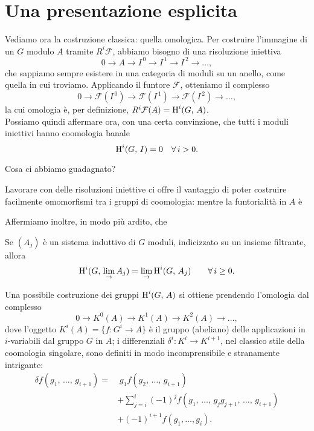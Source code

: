 \section{Una presentazione esplicita}
Vediamo ora la costruzione classica: quella omologica. Per costruire l'immagine di un $ G $ modulo $ A $ tramite $ R^i\mathcal{F} $, abbiamo bisogno di una risoluzione iniettiva
\[ 0 \to A \to I^{\,0} \to I^{\,1} \to I^{\,2} \to \dots, \]
che sappiamo sempre esistere in una categoria di moduli su un anello, come quella in cui troviamo. Applicando il funtore $ \mathcal{F} $, otteniamo il complesso
\[ 0 \to \mathcal{F}\left(I^{\,0}\right) \to \mathcal{F}\left(I^{\,1}\right) \to \mathcal{F}\left(I^{\,2}\right) \to \dots, \]
la cui omologia è, per definizione, $ R^i\mathcal{F}(A) = \operatorname{H}^i(G, \, A) $. \\

Possiamo quindi affermare ora, con una certa convinzione, che tutti i moduli iniettivi hanno coomologia banale
\begin{equation} \label{injban}
	\operatorname{H}^i(G, \, I) = 0 \quad \forall \, i > 0.
\end{equation}

Cosa ci abbiamo guadagnato?

Lavorare con delle risoluzioni iniettive ci offre il vantaggio di poter costruire facilmente omomorfismi tra i gruppi di coomologia: mentre la funtorialità in $ A $ è  




Affermiamo inoltre, in modo più ardito, che
\begin{proposition} 
	Se $ (A_j) $ è un sistema induttivo di $ G $ moduli, indicizzato su un insieme filtrante, allora
	\[ \operatorname{H}^i(G, \, \lim_\rightarrow A_j) = \lim_\rightarrow \operatorname{H}^i(G, \, A_j) \qquad \forall \, i \geq 0. \] 
\end{proposition}


Una possibile costruzione dei gruppi $ \operatorname{H}^i(G, \, A) $ si ottiene prendendo l'omologia dal complesso
\[ 0 \to K^0(A) \to K^1(A) \to K^2 (A) \to \dots, \]
dove l'oggetto $ K^i(A) = \{ f \colon G^i \to A\} $ è il gruppo (abeliano) delle applicazioni in $ i $-variabili dal gruppo $ G $ in $ A $; i differenziali $ \delta^i \colon K^i \to K^{i+1} $, nel classico stile della coomologia singolare, sono definiti in modo incomprensibile e stranamente intrigante:
\begin{align*}
	\delta f(g_1, \, \dots, \, g_{i+1}) = & \;  g_1 f(g_2, \, \dots, \, g_{i+1}) \\ & + \sum_{j = i}^{i} (-1)^j f(g_1, \, \dots, \, g_jg_{j+1}, \, \dots, \, g_{i+1}) \\ & + (-1)^{i+1} f(g_1, \dots, g_i).
\end{align*}

